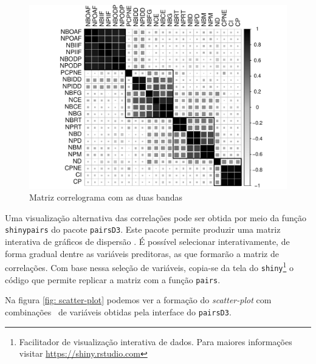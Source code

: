 \begin{figure}[H]
		\centering
		\includegraphics[scale=.75]{../../graficos/latex-graph-matriz-correlacao2.pdf}
		\caption{Matriz correlograma com as duas bandas}
		\label{fig: matriz-correlograma-2-bandas}
\end{figure}

Uma visualização alternativa das correlações pode ser obtida por meio da função \lstinline{shinypairs} do pacote \lstinline{pairsD3}. Este pacote 
permite produzir uma matriz interativa de gráficos de dispersão \cite{pairsD3}. É possível selecionar interativamente, de forma gradual dentre as variáveis preditoras, as que formarão a matriz de correlações. Com base nessa seleção de variáveis, copia-se da tela do \lstinline{shiny}\footnote{Facilitador de visualização interativa de dados. Para maiores informações visitar \url{https://shiny.rstudio.com}} o código que permite replicar a matriz com a função \lstinline{pairs}. 

Na figura \ref{fig: scatter-plot} podemos ver a formação do \textit{scatter-plot} com combinações\footnotemark~ de variáveis obtidas pela interface do \lstinline{pairsD3}.

